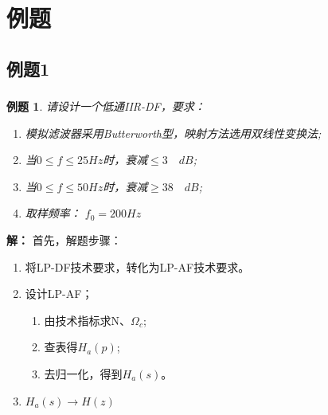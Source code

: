 \documentclass[notheorems,compress,mathserif,table]{beamer}
\newtheorem{example}{例题}
\begin{document}
\section*{例题}
%
\subsection*{例题1}
\begin{frame}\frametitle{}%
\begin{example}
请设计一个低通IIR-DF，要求：
\begin{enumerate}
  \item[(1)] 模拟滤波器采用Butterworth型，映射方法选用双线性变换法;
  \item[(2)] 当$0\leqslant f \leqslant 25Hz$时，衰减$\leqslant 3\quad dB$;
  \item[(3)] 当$0\leqslant f \leqslant 50Hz$时，衰减$\geqslant 38\quad dB$;
  \item[(4)] 取样频率： $f_0 = 200Hz$
\end{enumerate}
\end{example}
\textbf{解：}
  首先，解题步骤：

  \begin{enumerate}
     \item 将LP-DF技术要求，转化为LP-AF技术要求。
     \item 设计LP-AF；
         \begin{enumerate}
           \item 由技术指标求N、$\Omega_c$;
           \item 查表得$H_a(p)$;
           \item 去归一化，得到$H_a(s)$。
         \end{enumerate}
     \item $H_a(s)\longrightarrow H(z)$
   \end{enumerate}

\end{frame}
\end{document}

